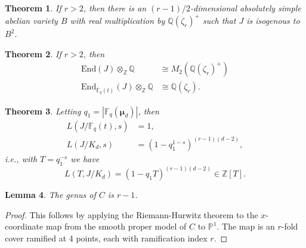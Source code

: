 \documentclass[reqno]{amsart}
\newtheorem{thm}{Theorem}[section]
\newtheorem{lem}[thm]{Lemma}
\theoremstyle{definition}
\theoremstyle{remark}
\def\bmu{{\boldsymbol\mu}}
\def\Q{\mathbb{Q}}
\def\Z{\mathbb{Z}}
\def\F{\mathbb{F}}
\def \End{\mathrm{End}}
\def\rank{\textnormal{rank}}
\def\P{\mathbb{P}}
\def\ker{\text{ker}}
\def\im{\text{im}}
\begin{document}
\begin{thm}
\label{decompthm}
If $r>2$, then there is an $(r-1)/2$-dimensional absolutely simple abelian variety $B$ with real multiplication by $\Q(\zeta_r)^+$ such that $J$ is isogenous to $B^2$.
\end{thm}

\begin{thm}
\label{endothm}
If $r>2$, then
\begin{align*}
\End(J) \otimes_\Z \Q &\cong M_2(\Q(\zeta_r)^+) \\
\End_{\bar{\F}_q(t)}(J)\otimes_\Z\Q &\cong \Q(\zeta_r).
\end{align*}
\end{thm}

%
%
%
%

\begin{thm}
\label{Lfnthm}
Letting $q_1=|\F_q(\bmu_d)|$, then
\begin{align*}
L(J/\F_q(t),s) &= 1,
\\
L(J/K_{d},s) &= (1 - q_1^{1-s})^{(r-1)(d-2)},
\end{align*}
i.e., with $T=q_1^{-s}$ we have
\[
L(T,J/K_d) = (1-q_1T)^{(r-1)(d-2)}\in\Z[T].
\]
\end{thm}


%

\begin{lem}
The genus of $C$ is $r-1$.
\end{lem}

\begin{proof}
This follows by applying the Riemann-Hurwitz theorem to the 
$x$-coordinate map from the smooth proper model of $C$ to $\P^1$. 
The map is an $r$-fold cover ramified at 4 points, each with ramification index $r$.
\end{proof}
\end{document}

